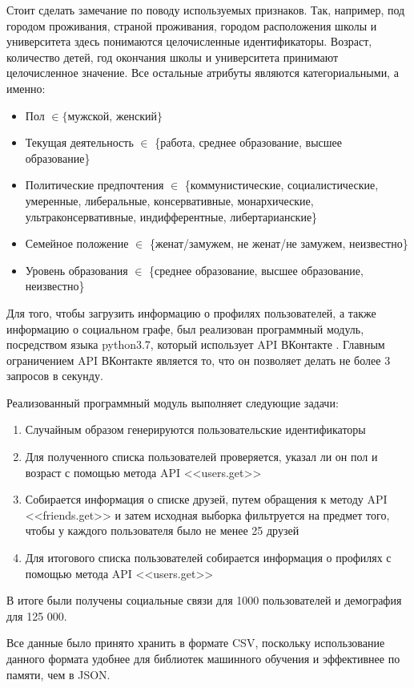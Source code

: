 Стоит сделать замечание по поводу используемых признаков. Так, например, под городом проживания, страной проживания, городом расположения школы и университета здесь понимаются целочисленные идентификаторы. Возраст, количество детей, год окончания школы и университета принимают целочисленное значение. Все остальные атрибуты являются категориальными, а именно:
\begin{itemize}
\item Пол $\in \{\text{мужской, женский}\}$
\item Текущая деятельность $\in$ \{работа, среднее образование, высшее образование\}
\item Политические предпочтения $\in$ \{коммунистические, социалистические, умеренные, либеральные, консервативные, монархические, ультраконсервативные, индифферентные, либертарианские\}
\item Семейное положение $\in$ \{женат/замужем, не женат/не замужем, неизвестно\}
\item Уровень образования $\in$ \{среднее образование, высшее образование, неизвестно\}
\end{itemize}


Для того, чтобы загрузить информацию о профилях пользователей, а также информацию о социальном графе,  был реализован программный модуль, посредством языка python3.7, который использует API ВКонтакте \cite{API VK}. Главным ограничением API ВКонтакте является то, что он позволяет делать не более 3 запросов в секунду.

Реализованный программный модуль выполняет следующие задачи:
\begin{enumerate}
\item Случайным образом генерируются пользовательские идентификаторы 
\item Для полученного списка пользователей проверяется, указал ли он пол и возраст с помощью метода API <<users.get>>
\item Собирается информация о списке друзей, путем обращения к методу API <<friends.get>> и затем исходная выборка фильтруется на предмет того, чтобы у каждого пользователя было не менее 25 друзей
\item Для итогового списка пользователей собирается информация о профилях с помощью метода API <<users.get>>
\end{enumerate}

В итоге были получены социальные связи для 1000 пользователей и демография для 125 000.

Все данные было принято хранить в формате CSV, поскольку использование данного формата удобнее для библиотек машинного обучения и эффективнее по памяти, чем в JSON.

